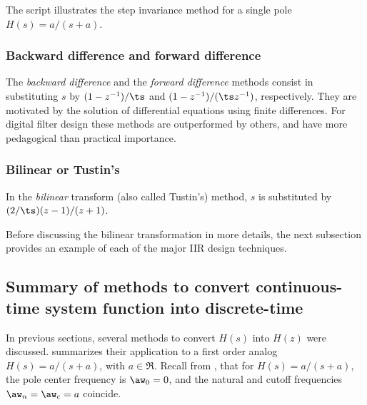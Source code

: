 The script  illustrates the step invariance method for a single pole $H(s)=a/(s+a)$.

\subsubsection{Backward difference and forward difference}

The \emph{backward difference} and the \emph{forward difference} methods consist in substituting $s$ by $(1-z^{-1})/\ts$ and $(1-z^{-1})/(\ts z^{-1})$, respectively. They are motivated by the
solution of differential equations using finite differences. For digital filter design these methods
are outperformed by others, and have more pedagogical than practical importance.

\subsubsection{Bilinear or Tustin's}

In the \emph{bilinear} transform  (also called Tustin's) method, $s$ is substituted by $(2/\ts)(z-1)/(z+1)$.


Before discussing the bilinear transformation in more details, 
the next subsection provides an example of each of the major IIR design techniques.

\subsection{Summary of methods to convert continuous-time system function into discrete-time}

In previous sections, several methods to convert $H(s)$ into $H(z)$ were discussed.
 summarizes their application to a first order analog $H(s)=a/(s+a)$, with $a \in \Re$. 
Recall from , that for 
 $H(s)=a/(s+a)$, the pole center frequency is $\aw_0 = 0$, and the natural and cutoff frequencies $\aw_n = \aw_c = a$ coincide.

